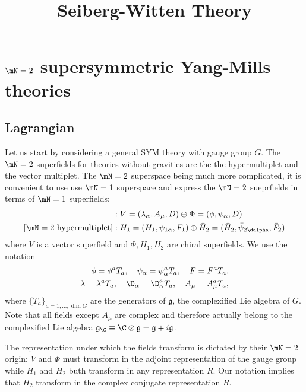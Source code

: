 \documentclass{worksheetclass}
\title{Seiberg-Witten Theory}
\begin{document}
\maketitle

\tableofcontents

\section{$\mN=2$ supersymmetric Yang-Mills theories}

    \subsection{Lagrangian}

        Let us start by considering a general SYM theory with gauge group $G$. The $\mN=2$ superfields for theories without gravities are the the hypermultiplet and the vector multiplet. The $\mN=2$ superspace being much more complicated, it is convenient to use use $\mN=1$ superspace and express the $\mN=2$ sueprfields in terms of $\mN=1$ superfields:
        \begin{align}
            [\mN=2 \text{ vector multiplet}] &: V=(\lambda_\alpha,A_\mu,D)\oplus \Phi=(\phi,\psi_\alpha,D)\\
            [\mN=2 \text{ hypermultiplet}] &: H_1=(H_1,\psi_{1\alpha},F_1)\oplus \bar{H}_2=(\bar{H}_2,\bar{\psi}_{2\dalpha},\bar{F}_2)
        \end{align}
        where $V$ is a vector superfield and $\Phi,H_1,H_2$ are chiral superfields. We use the notation
        \begin{align}
            \phi=\phi^a T_a,\quad \psi_\alpha=\psi^a_\alpha T_a,\quad F=F^a T_a,\\
            \lambda=\lambda^a T_a,\quad \D_\alpha=\D^a_\alpha T_a,\quad A_\mu=A^a_\mu T_a,
        \end{align}
        where $\{T_a\}_{a=1,\dots,\dim G}$ are the generators of $\mathfrak{g}$, the complexified Lie algebra of $G$. Note that all fields except $A_\mu$ are complex and therefore actually belong to the complexified Lie algebra $\mathfrak{g}_\C\equiv\C\otimes\mathfrak{g}=\mathfrak{g}+i\mathfrak{g}$.
        
        The representation under which the fields transform is dictated by their $\mN=2$ origin: $V$ and $\Phi$ must transform in the adjoint representation of the gauge group while $H_1$ and $\bar{H}_2$ buth transform in any representation $R$. Our notation implies that $H_2$ transform in the complex conjugate representation $\bar{R}$.
\end{document}
